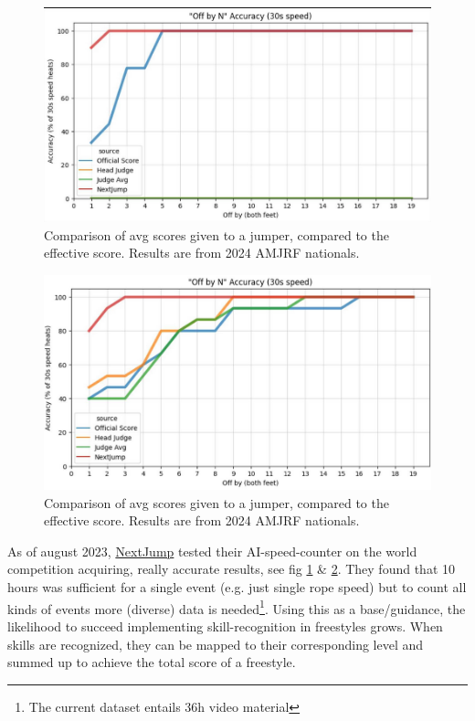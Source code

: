 \begin{figure}
    \centering
    \includegraphics[width=0.95\linewidth]{img/nextjump-off-by-feet}
    \caption[nextjump-results]{Comparison of avg scores given to a jumper, compared to the effective score. Results are from 2024 AMJRF nationals.}
    \label{fig:nextjump-off-by-feet}
\end{figure}

\begin{figure}
    \centering
    \includegraphics[width=0.95\linewidth]{img/nextjump-off-by-feet-judges}
    \caption[nextjump-results-multi]{Comparison of avg scores given to a jumper, compared to the effective score. Results are from 2024 AMJRF nationals.}
    \label{fig:nextjump-off-by-feet-judges}
\end{figure}

As of august 2023, \href{https://nextjump.app/}{NextJump} tested their AI-speed-counter on the world competition acquiring, really accurate results, see fig \ref{fig:nextjump-off-by-feet} \& \ref{fig:nextjump-off-by-feet-judges}. They found that 10 hours was sufficient for a single event (e.g. just single rope speed) but to count all kinds of events more (diverse) data is needed\footnote{The current dataset entails 36h video material}. Using this as a base/guidance, the likelihood to succeed implementing skill-recognition in freestyles grows.
When skills are recognized, they can be mapped to their corresponding level and summed up to achieve the total score of a freestyle.


